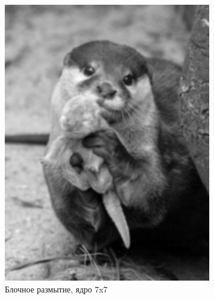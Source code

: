 \begin{figure}[ht!]
\begin{subfigure}[b]{0.5\linewidth}
        \includegraphics[width=0.95\linewidth]{block_7.png}
        \caption{Блочное размытие, ядро 7x7}
    \end{subfigure}%
    \begin{subfigure}[b]{0.5\linewidth}
        \centering

\end{subfigure}
\end{figure}
